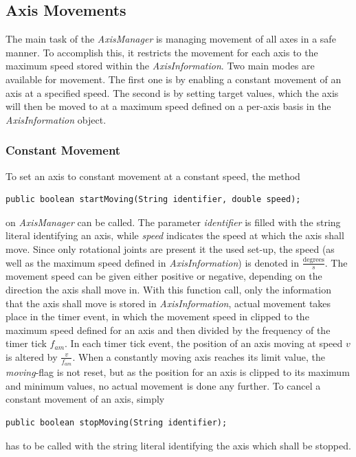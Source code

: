 \subsection{Axis Movements}
\label{sec:impl:axismovements}

The main task of the \textit{AxisManager} is managing movement of all axes in a safe manner. To accomplish this, it restricts the movement for each axis to the maximum speed stored within the \textit{AxisInformation}. Two main modes are available for movement. The first one is by enabling a constant movement of an axis at a specified speed. The second is by setting target values, which the axis will then be moved to at a maximum speed defined on a per-axis basis in the \textit{AxisInformation} object.

\subsubsection{Constant Movement}

To set an axis to constant movement at a constant speed, the method
\begin{lstlisting}
public boolean startMoving(String identifier, double speed);
\end{lstlisting}
on \textit{AxisManager} can be called. The parameter \textit{identifier} is filled with the string literal identifying an axis, while \textit{speed} indicates the speed at which the axis shall move. Since only rotational joints are present it the used set-up, the speed (as well as the maximum speed defined in \textit{AxisInformation}) is denoted in $\frac{\text{degrees}}{s}$. The movement speed can be given either positive or negative, depending on the direction the axis shall move in. With this function call, only the information that the axis shall move is stored in \textit{AxisInformation}, actual movement takes place in the timer event, in which the movement speed in clipped to the maximum speed defined for an axis and then divided by the frequency of the timer tick $f_{am}$. In each timer tick event, the position of an axis moving at speed $v$ is altered by $\frac{v}{f_{am}}$. When a constantly moving axis reaches its limit value, the \textit{moving}-flag is not reset, but as the position for an axis is clipped to its maximum and minimum values, no actual movement is done any further. To cancel a constant movement of an axis, simply
\begin{lstlisting}
public boolean stopMoving(String identifier);
\end{lstlisting}
has to be called with the string literal identifying the axis which shall be stopped.

